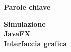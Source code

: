 
\newcommand{\clearemptydoublepage}{\newpage{\pagestyle{empty}%
    \cleardoublepage}}

\clearemptydoublepage
\thispagestyle{empty}
\vspace*{20ex}
\begin{flushright}
    \begin{LARGE}
        \textbf{Parole chiave}\\
        \vspace{5ex}
    \end{LARGE}
    \begin{normalsize}
        \textbf{%
            Simulazione\\%
            \medskip
            JavaFX\\%
            \medskip
            Interfaccia grafica%
        }
    \end{normalsize}
\end{flushright}
\vfill
\clearemptydoublepage
